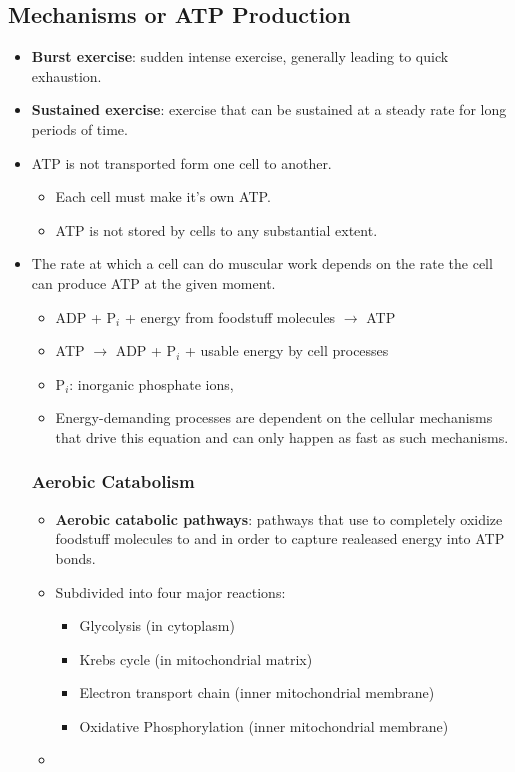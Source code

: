 \documentclass[12pt,a4paper]{article}
\begin{document}
\subsection{Mechanisms or ATP Production}
\begin{itemize}
    \item \textbf{Burst exercise}: sudden intense exercise, generally leading to quick exhaustion.
    \item \textbf{Sustained exercise}: exercise that can be sustained at a steady rate for long periods of time.
    \item ATP is not transported form one cell to another.
        \begin{itemize}
            \item {\color{o-Sun}Each cell must make it's own ATP}.
            \item {\color{o-Sun}ATP is not stored by cells to any substantial extent}.
        \end{itemize}
    \item The rate at which a cell can do muscular work depends on the rate the cell can produce ATP at the given moment.
        \begin{itemize}
            \item ADP + P\(_{i}\) + energy from foodstuff molecules \(\rightarrow\) ATP
            \item ATP \(\rightarrow\) ADP + P\(_{i}\) + usable energy by cell processes
            \item P\(_{i}\): inorganic phosphate ions, {\color{neg}}
            \item Energy-demanding processes are dependent on the cellular mechanisms that drive this equation and can only happen as fast as such mechanisms.
        \end{itemize}
    \subsubsection{Aerobic Catabolism}
    \begin{itemize}
        \item \textbf{Aerobic catabolic pathways}: pathways that use  to completely oxidize foodstuff molecules to  and  in order to capture realeased energy into ATP bonds.
        \item Subdivided into four major reactions:
            \begin{itemize}
                \item Glycolysis (in cytoplasm)
                \item Krebs cycle (in mitochondrial matrix)
                \item Electron transport chain (inner mitochondrial membrane)
                \item Oxidative Phosphorylation (inner mitochondrial membrane)
            \end{itemize}
        \item 
    \end{itemize}
\end{itemize}
\end{document}
